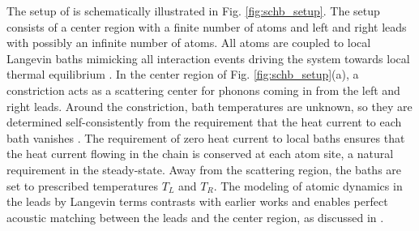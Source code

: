 

The setup of  is schematically illustrated in Fig. \ref{fig:schb_setup}. The setup consists of a center region with a finite number of atoms and left and right leads with possibly an infinite number of atoms. All atoms are coupled to local Langevin baths mimicking all interaction events driving the system towards local thermal equilibrium \cite{bolsterli70}. In the center region of Fig. \ref{fig:schb_setup}(a), a constriction acts as a scattering center for phonons coming in from the left and right leads. Around the constriction, bath temperatures are unknown, so they are determined self-consistently from the requirement that the heat current to each bath vanishes \cite{bolsterli70}. The requirement of zero heat current to local baths ensures that the heat current flowing in the chain is conserved at each atom site, a natural requirement in the steady-state. Away from the scattering region, the baths are set to prescribed temperatures $T_L$ and $T_R$. The modeling of atomic dynamics in the leads by Langevin terms contrasts with earlier works \cite{dhar06} and enables perfect acoustic matching between the leads and the center region, as discussed in .  %


